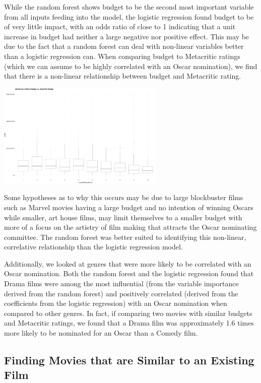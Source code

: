 \documentclass[10pt]{article}
\begin{document}
While the random forest shows budget to be the second most important variable from all inputs feeding into the model, the logistic regression found budget to be of very little impact, with an odds ratio of close to 1 indicating that a unit increase in budget had neither a large negative nor positive effect. This may be due to the fact that a random forest can deal with non-linear variables better than a logistic regression can. When comparing budget to Metacritic ratings (which we can assume to be highly correlated with an Oscar nomination), we find that there is a non-linear relationship between budget and Metacritic rating. 

\begin{center}
\includegraphics[width=8cm]{_assets/_eda/eda__boxplot_budget_vs_metacritic_binned.png}
\end{center}

Some hypotheses as to why this occurs may be due to large blockbuster films such as Marvel movies having a large budget and no intention of winning Oscars while smaller, art house films, may limit themselves to a smaller budget with more of a focus on the artistry of film making that attracts the Oscar nominating committee. The random forest was better suited to identifying this non-linear, correlative relationship than the logistic regression model.

Additionally, we looked at genres that were more likely to be correlated with an Oscar nomination. Both the random forest and the logistic regression found that Drama films were among the most influential (from the variable importance derived from the random forest) and positively correlated (derived from the coefficients from the logistic regression) with an Oscar nomination when compared to other genres. In fact, if comparing two movies with similar budgets and Metacritic ratings, we found that a Drama film was approximately 1.6 times more likely to be nominated for an Oscar than a Comedy film.

\subsection{Finding Movies that are Similar to an Existing Film}
\end{document}
